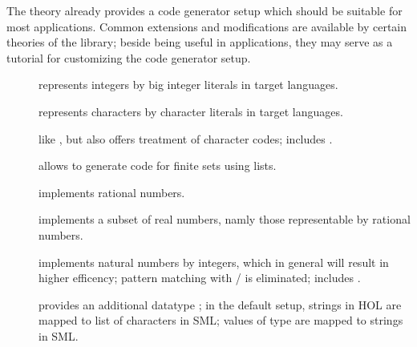 \begin{isabellebody}
\begin{isamarkuptext}
\begin{itemize}
  \end{itemize}%
\end{isamarkuptext}%
\isamarkuptrue%
%
\isamarkuptrue%
%
\begin{isamarkuptext}%
The   theory already provides a code
  generator setup
  which should be suitable for most applications. Common extensions
  and modifications are available by certain theories of the 
  library; beside being useful in applications, they may serve
  as a tutorial for customizing the code generator setup.

  \begin{description}

    \item[] represents  integers by big
       integer literals in target languages.
    \item[] represents  characters by 
       character literals in target languages.
    \item[] like ,
       but also offers treatment of character codes; includes
       .
    \item[] allows to generate code
       for finite sets using lists.
    \item[] implements rational
       numbers.
    \item[] implements a subset of real numbers,
       namly those representable by rational numbers.
    \item[] \label{eff_nat} implements natural numbers by integers,
       which in general will result in higher efficency; pattern
       matching with  / 
       is eliminated;  includes .
    \item[] provides an additional datatype ;
       in the  default setup, strings in HOL are mapped to list
       of  characters in SML; values of type  are
       mapped to strings in SML.

  \end{description}


\end{isamarkuptext}
\end{isabellebody}
